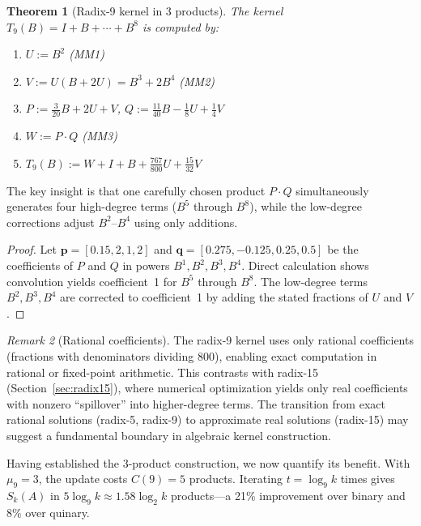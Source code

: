 \documentclass[
  journal=largetwo,
  manuscript=article,
  manuscriptlabel={Research Preprint},
  logo=false,
  simfonts=false,
  year=2026,
  volume=1,
]{cup-journal}
\newtheorem{theorem}{Theorem}[section]
\theoremstyle{definition}
\theoremstyle{remark}
\newtheorem{remark}[theorem]{Remark}
\begin{document}
\begin{theorem}[Radix-9 kernel in 3 products]
  \label{thm:radix9}
  The kernel $T_9(B) = I + B + \cdots + B^8$ is computed by:
  \begin{enumerate}
    \item $U := B^2$ \hfill (MM1)
    \item $V := U(B + 2U) = B^3 + 2B^4$ \hfill (MM2)
    \item $P := \tfrac{3}{20}B + 2U + V$, \quad $Q := \tfrac{11}{40}B - \tfrac{1}{8}U + \tfrac{1}{4}V$
    \item $W := P \cdot Q$ \hfill (MM3)
    \item $T_9(B) := W + I + B + \tfrac{767}{800}U + \tfrac{15}{32}V$
  \end{enumerate}
\end{theorem}

The key insight is that one carefully chosen product $P \cdot Q$ simultaneously
generates four high-degree terms ($B^5$ through $B^8$), while the
low-degree corrections adjust $B^2$--$B^4$ using only additions.

\begin{proof}
  Let $\mathbf{p} = [0.15, 2, 1, 2]$ and $\mathbf{q} = [0.275, -0.125, 0.25, 0.5]$
  be the coefficients of $P$ and $Q$ in powers $B^1, B^2, B^3, B^4$. Direct
  calculation shows convolution yields coefficient~1 for $B^5$ through $B^8$.
  The low-degree terms $B^2, B^3, B^4$ are corrected to coefficient~1 by
  adding the stated fractions of $U$ and $V$.
\end{proof}

\begin{remark}[Rational coefficients]
  \label{rem:rational}
  The radix-9 kernel uses only rational coefficients (fractions with denominators dividing 800), enabling exact computation in rational or fixed-point arithmetic.
  This contrasts with radix-15 (Section~\ref{sec:radix15}), where numerical optimization yields only real coefficients with nonzero ``spillover'' into higher-degree terms.
  The transition from exact rational solutions (radix-5, radix-9) to approximate real solutions (radix-15) may suggest a fundamental boundary in algebraic kernel construction.
\end{remark}

Having established the 3-product construction, we now quantify its benefit.
With $\mu_9 = 3$, the update costs $C(9) = 5$ products. Iterating $t = \log_9 k$
times gives $S_k(A)$ in $5\log_9 k \approx 1.58\log_2 k$ products---a 21\%
improvement over binary and 8\% over quinary.
\end{document}

